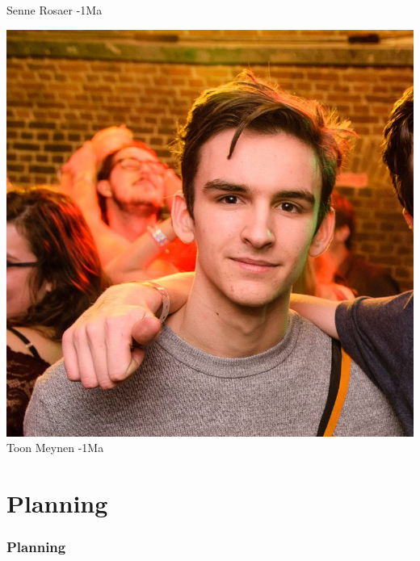 \begin{frame}
\begin{minipage}{0.30\linewidth}
        \footnotesize Senne Rosaer -1Ma\strut%
    \end{minipage}
    \begin{minipage}{0.30\linewidth}%
		\centering%
		\includegraphics[width=\linewidth]{res/toon} \\%
		\footnotesize Toon Meynen -1Ma\strut%
    \end{minipage}
\end{frame}  
   
    
\section{Planning}
\addtocounter{minutes}{3}
\begin{frame}
	\frametitle{Planning}
    

\end{frame}

